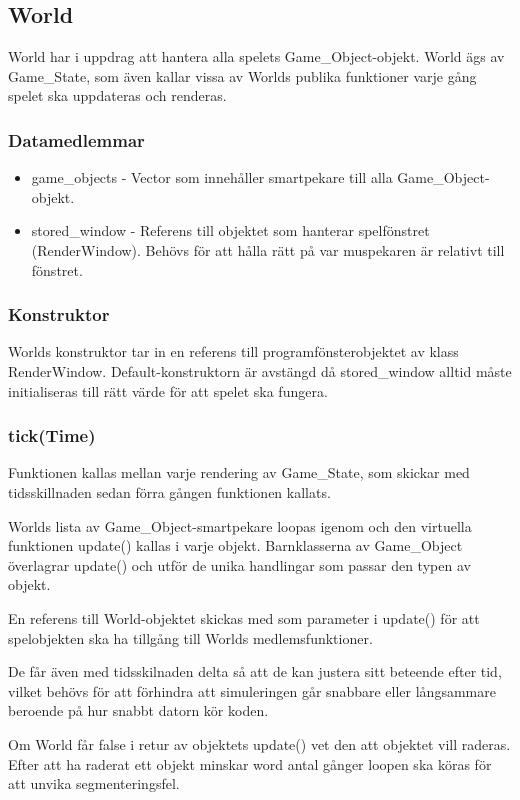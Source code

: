 \documentclass{TDP005mall}
\begin{document}
\subsection{World}
World har i uppdrag att hantera alla spelets Game\_Object-objekt. World ägs av Game\_State, som även kallar vissa av Worlds publika funktioner varje gång spelet ska uppdateras och renderas.  

\subsubsection{Datamedlemmar}
\begin{itemize}
\item game\_objects  - Vector som innehåller smartpekare till alla Game\_Object-objekt.
\item stored\_window - Referens till objektet som hanterar spelfönstret (RenderWindow). Behövs för att hålla rätt på var muspekaren är relativt till fönstret.
\end{itemize}

\subsubsection{Konstruktor}
Worlds konstruktor tar in en referens till programfönsterobjektet av klass RenderWindow. Default-konstruktorn är avstängd då stored\_window alltid måste initialiseras till rätt värde för att spelet ska fungera. 

\subsubsection{tick(Time)}
Funktionen kallas mellan varje rendering av Game\_State, som skickar med tidsskillnaden sedan förra gången funktionen kallats. 

Worlds lista av Game\_Object-smartpekare loopas igenom och den virtuella funktionen update() kallas i varje objekt. Barnklasserna av Game\_Object överlagrar update() och utför de unika handlingar som passar den typen av objekt. 

En referens till World-objektet skickas med som parameter i update() för att spelobjekten ska ha tillgång till Worlds medlemsfunktioner.

De får även med tidsskilnaden delta så att de kan justera sitt beteende efter tid, vilket behövs för att förhindra att simuleringen går snabbare eller långsammare beroende på hur snabbt datorn kör koden. 

Om World får false i retur av objektets update() vet den att objektet vill raderas. Efter att ha raderat ett objekt minskar word antal gånger loopen ska köras för att unvika segmenteringsfel.
\end{document}
